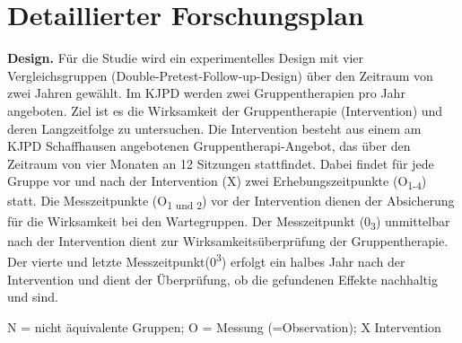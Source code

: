 %
%
\chapter{Detaillierter Forschungsplan}\label{chap.forschungsplan}
\glsresetall
\textbf{Design.} Für die Studie wird ein experimentelles Design mit vier Vergleichsgruppen (Double-Pretest-Follow-up-Design) über den Zeitraum von zwei Jahren gewählt. Im KJPD werden zwei Gruppentherapien pro Jahr angeboten. Ziel ist es die Wirksamkeit der Gruppentherapie (Intervention) und deren Langzeitfolge zu untersuchen. Die Intervention besteht aus einem am KJPD Schaffhausen angebotenen Gruppentherapi-Angebot, das über den Zeitraum von vier Monaten an 12 Sitzungen stattfindet. Dabei findet für jede Gruppe vor und nach der Intervention (X) zwei Erhebungszeitpunkte (O\textsubscript{1-4}) statt. Die Messzeitpunkte (O\textsubscript{1 und 2}) vor der Intervention dienen der Absicherung für die Wirksamkeit bei den Wartegruppen. Der Messzeitpunkt (0\textsubscript{3}) unmittelbar nach der Intervention dient zur Wirksamkeitsüberprüfung der Gruppentherapie. Der vierte und letzte Messzeitpunkt(0\textsuperscript{3}) erfolgt ein halbes Jahr nach der Intervention und dient der Überprüfung, ob die gefundenen Effekte nachhaltig und sind.

\begin{center}
\end{center}
N = nicht äquivalente Gruppen; O = Messung (=Observation); X Intervention

